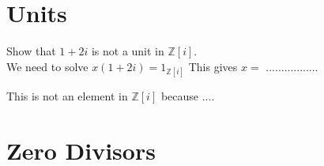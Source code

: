 \section{Units}


\begin{example}
Show that $1+2i$ is not a unit in $\mathbb{Z}[i]$. \\
We need to solve $x(1+2i) = 1_{\mathbb{Z}[i]}$ This gives $x = $ .................


This is not an element in $\mathbb{Z}[i]$ because ....

\end{example}


\section{Zero Divisors}